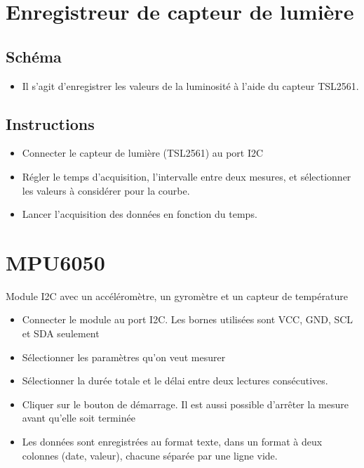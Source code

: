 \documentclass[a4paper,12pt,french]{sphinxmanual}
\let\sphinxpxdimen\pdfpxdimen\else\newdimen\sphinxpxdimen
\begin{document}
\section{Enregistreur de capteur de lumière}
\label{\detokenize{8.2:enregistreur-de-capteur-de-lumiere}}\label{\detokenize{8.2::doc}}

\subsection{Schéma}
\label{\detokenize{8.2:schema}}\begin{itemize}
\item {} 
Il s’agit d’enregistrer les valeurs de la luminosité à l’aide du capteur TSL2561.

\end{itemize}


\subsection{Instructions}
\label{\detokenize{8.2:instructions}}\begin{itemize}
\item {} 
Connecter le capteur de lumière (TSL2561) au port I2C

\item {} 
Régler le temps d’acquisition, l’intervalle entre deux mesures, et sélectionner les valeurs à considérer pour la courbe.

\item {} 
Lancer l’acquisition des données en fonction du temps.

\end{itemize}


\section{MPU6050}
\label{\detokenize{8.3:mpu6050}}\label{\detokenize{8.3::doc}}
\noindent\sphinxincludegraphics[width=300\sphinxpxdimen]{{MPU6050}.pdf}

Module I2C avec un accéléromètre, un gyromètre et un capteur de température
\begin{itemize}
\item {} 
Connecter le module au port I2C. Les bornes utilisées sont VCC, GND, SCL et SDA seulement

\item {} 
Sélectionner les paramètres qu’on veut mesurer

\item {} 
Sélectionner la durée totale et le délai entre deux lectures consécutives.

\item {} 
Cliquer sur le bouton de démarrage. Il est aussi possible d’arrêter la mesure avant qu’elle soit terminée

\item {} 
Les données sont enregistrées au format texte, dans un format à deux colonnes (date, valeur), chacune séparée par une ligne vide.

\end{itemize}
\end{document}
